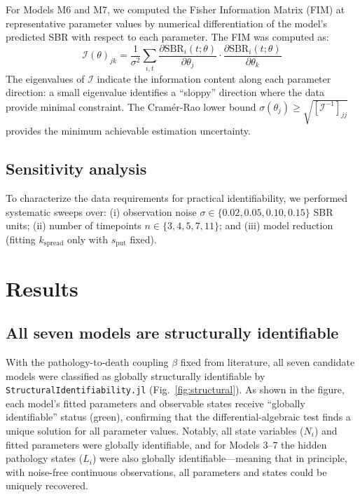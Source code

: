 For Models M6 and M7, we computed the Fisher Information Matrix (FIM) at representative parameter values by numerical differentiation of the model's predicted SBR with respect to each parameter. The FIM was computed as:
\begin{equation}
\mathcal{I}(\theta)_{jk} = \frac{1}{\sigma^2} \sum_{i,t} \frac{\partial \text{SBR}_i(t; \theta)}{\partial \theta_j} \cdot \frac{\partial \text{SBR}_i(t; \theta)}{\partial \theta_k}
\end{equation}
The eigenvalues of $\mathcal{I}$ indicate the information content along each parameter direction: a small eigenvalue identifies a ``sloppy'' direction \cite{gutenkunst2007} where the data provide minimal constraint. The Cram\'{e}r-Rao lower bound $\sigma(\theta_j) \geq \sqrt{[\mathcal{I}^{-1}]_{jj}}$ provides the minimum achievable estimation uncertainty.

\subsection{Sensitivity analysis}

To characterize the data requirements for practical identifiability, we performed systematic sweeps over: (i) observation noise $\sigma \in \{0.02, 0.05, 0.10, 0.15\}$ SBR units; (ii) number of timepoints $n \in \{3, 4, 5, 7, 11\}$; and (iii) model reduction (fitting $k_{\text{spread}}$ only with $s_{\text{put}}$ fixed).

\section{Results}

\subsection{All seven models are structurally identifiable}

With the pathology-to-death coupling $\beta$ fixed from literature, all seven candidate models were classified as globally structurally identifiable by \texttt{StructuralIdentifiability.jl} (Fig.~\ref{fig:structural}). As shown in the figure, each model's fitted parameters and observable states receive ``globally identifiable'' status (green), confirming that the differential-algebraic test finds a unique solution for all parameter values. Notably, all state variables ($N_i$) and fitted parameters were globally identifiable, and for Models 3--7 the hidden pathology states ($L_i$) were also globally identifiable---meaning that in principle, with noise-free continuous observations, all parameters and states could be uniquely recovered.

